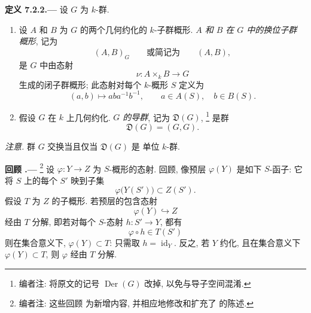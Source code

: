 
\medskip
{}\label{def:sga3-VIB-7.2.2}%
\noindent\textbf{定义 7.2.2.---}
设 \(G\) 为 \(k\)-群.
\begin{enumerate}
\item[\textup{a)}]\label{def:sga3-VIB-7.2.2-a}
  设 \(A\) 和 \(B\) 为 \(G\) 的两个几何约化的
  \(k\)-子群概形. \emph{\(A\) 和 \(B\) 在 \(G\) 中的换位子群
  概形}, 记为
  \[
    (A,B)_G
    \qquad\text{或简记为}\qquad
    (A,B),
  \]
  是 \(G\) 中由态射
  \label{form:sga3-VIB-7.2.2-commutator}%
  \[
    \nu:A\times_kB\longrightarrow G
  \]
  生成的闭子群概形; 此态射对每个 \(k\)-概形 \(S\) 定义为
  \[
    (a,b)\longmapsto aba^{-1}b^{-1},
    \qquad
    a\in A(S),\quad b\in B(S).
  \]

\item[\textup{b)}]\label{def:sga3-VIB-7.2.2-b}
  假设 \(G\) 在 \(k\) 上几何约化.
  \emph{\(G\) 的导群}, 记为 \(\mathfrak{D}(G)\),%
  \footnote{\label{note:sga3-VIB-73}编者注: 将原文的记号
  \(\operatorname{Der}(G)\) 改掉,
  以免与导子空间混淆.}
  是群
  \[
    \mathfrak{D}(G)=(G,G).
  \]
\end{enumerate}

\noindent\emph{注意.}
群 \(G\) 交换当且仅当 \(\mathfrak{D}(G)\) 是
单位 \(k\)-群.

\medskip
{}\label{recall:sga3-VIB-7.3.0}%
\noindent\textbf{回顾 .---}%
\footnote{\label{note:sga3-VIB-74}编者注: 这些回顾
为新增内容, 并相应地修改和扩充了
 的陈述.}
设 \(\varphi:Y\to Z\) 为 \(S\)-概形的态射. 回顾,
像预层 \(\varphi(Y)\) 是如下 \(S\)-函子:
它将 \(S\) 上的每个 \(S'\) 映到子集
\[
  \varphi\bigl(Y(S')\bigr)\subset Z(S').
\]
假设 \(T\) 为 \(Z\) 的子概形. 若预层的包含态射
\[
  \varphi(Y)\hookrightarrow Z
\]
经由 \(T\) 分解, 即若对每个 \(S\)-态射 \(h:S'\to Y\),
都有
\[
  \varphi\circ h\in T(S')
\]
则在集合意义下,
\(\varphi(Y)\subset T\): 只需取 \(h=\operatorname{id}_Y\).
反之, 若 \(Y\) 约化, 且在集合意义下
\(\varphi(Y)\subset T\), 则 \(\varphi\)
经由 \(T\) 分解.

